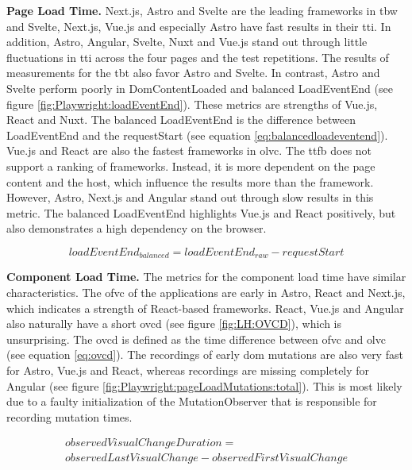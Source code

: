 \documentclass[a4paper, 12pt]{article}
\begin{document}
\textbf{Page Load Time.} Next.js, Astro and Svelte are the leading frameworks in \acrshort{tbw} and Svelte, Next.js, Vue.js and especially Astro have fast results in their \acrshort{tti}.
In addition, Astro, Angular, Svelte, Nuxt and Vue.js stand out through little fluctuations in \acrshort{tti} across the four pages and the test repetitions.
The results of measurements for the \acrshort{tbt} also favor Astro and Svelte.
In contrast, Astro and Svelte perform poorly in DomContentLoaded and balanced LoadEventEnd (see figure \ref{fig:Playwright:loadEventEnd}).
These metrics are strengths of Vue.js, React and Nuxt.
The balanced LoadEventEnd is the difference between LoadEventEnd and the requestStart (see equation \ref{eq:balancedloadeventend}).
Vue.js and React are also the fastest frameworks in \acrshort{olvc}.
The \acrshort{ttfb} does not support a ranking of frameworks.
Instead, it is more dependent on the page content and the host, which influence the results more than the framework.
However, Astro, Next.js and Angular stand out through slow results in this metric.
The balanced LoadEventEnd highlights Vue.js and React positively, but also demonstrates a high dependency on the browser.

\vspace{-0.3cm}
\begin{equation}\label{eq:balancedloadeventend}
\mathit{loadEventEnd}_\mathit{balanced} = \mathit{loadEventEnd}_\mathit{raw} - \mathit{requestStart}
\end{equation}
\vspace{-0.2cm}

\textbf{Component Load Time.} The metrics for the component load time have similar characteristics.
The \acrshort{ofvc} of the applications are early in Astro, React and Next.js, which indicates a strength of React-based frameworks.
React, Vue.js and Angular also naturally have a short \acrfull{ovcd} (see figure \ref{fig:LH:OVCD}), which is unsurprising.
The \acrshort{ovcd} is defined as the time difference between \acrshort{ofvc} and \acrshort{olvc} (see equation \ref{eq:ovcd}).
The recordings of early \acrshort{dom} mutations are also very fast for Astro, Vue.js and React, whereas recordings are missing completely for Angular (see figure \ref{fig:Playwright:pageLoadMutations:total}).
This is most likely due to a faulty initialization of the MutationObserver that is responsible for recording mutation times.

\vspace{-0.8cm}
\begin{multline}\label{eq:ovcd}
  \mathit{observedVisualChangeDuration} =\\ \mathit{observedLastVisualChange} - \mathit{observedFirstVisualChange}
\end{multline}
\end{document}
